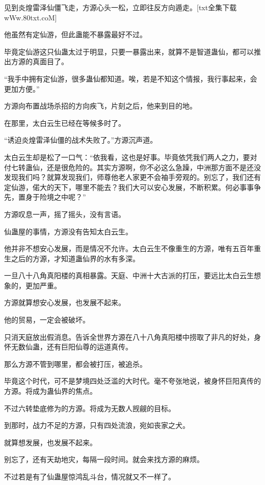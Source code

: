 
\begin{this_body}

见到炎煌雷泽仙僵飞走，方源心头一松，立即往反方向遁走。[txt全集下载wWw.80txt.coM]

他虽然有定仙游，但此蛊能不暴露最好不过。

毕竟定仙游这只仙蛊太过于明显，只要一暴露出来，就算不是智道蛊仙，都可以推出方源的真面目了。

“我手中拥有定仙游，很多蛊仙都知道。唉，若是不知这个情报，我行事起来，会更加方便。”

方源向布置战场杀招的方向疾飞，片刻之后，他来到目的地。

在那里，太白云生已经在等候多时了。

“诱迫炎煌雷泽仙僵的战术失败了。”方源沉声道。

太白云生却是松了一口气：“依我看，这也是好事。毕竟依凭我们两人之力，要对付七转蛊仙，还是很危险的。其实方源啊，你不必这么急躁，中洲那方面不是还没发现我们吗？就算发现我们，师尊他老人家更不会袖手旁观的。别忘了，我们还有定仙游，偌大的天下，哪里不能去？我们大可以安心发展，不断积累。何必事事争先，置身于险境之中呢？”

方源叹息一声，摇了摇头，没有言语。

仙蛊屋的事情，方源没有告知太白云生。

他并非不想安心发展，而是情况不允许。太白云生不像重生的方源，唯有五百年重生之后的方源，才知道蛊仙界的水有多深。

一旦八十八角真阳楼的真相暴露。天庭、中洲十大古派的打压，要远比太白云生想象的，更加严重。

方源就算想安心发展，也发展不起来。

他的贸易，一定会被破坏。

只消天庭放出假消息。告诉全世界方源在八十八角真阳楼中捞取了非凡的好处，身怀无数仙蛊，还有巨阳仙尊的运道真传。

那么方源不管到哪里，都会被打压，被追杀。

毕竟这个时代，可不是梦境四处泛滥的大时代。毫不夸张地说，被身怀巨阳真传的方源。将成为蛊仙界的焦点。

不过六转垫底修为的方源。将成为无数人觊觎的目标。

到那时，战力不足的方源，只有四处流浪，宛如丧家之犬。

就算想发展，也发展不起来。

别忘了，还有天劫地灾，每隔一段时间。就会来找方源的麻烦。

不过若是有了仙蛊屋惊鸿乱斗台，情况就又不一样了。


\end{this_body}
